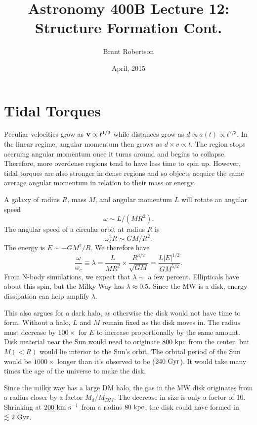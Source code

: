 \documentclass[]{article}
\title{Astronomy 400B Lecture 12: Structure Formation Cont.}
\author{Brant Robertson}
\date{April, 2015}
\begin{document}
\maketitle

\section{Tidal Torques}

Peculiar velocities grow as $\mathbf{v}\propto t^{1/3}$ while distances
grow as $d\propto a(t) \propto t^{2/3}$. In the linear regime,
angular momentum then grows as $d \times v\propto t$. The
region stops accruing angular momentum once it turns around
and begins to collapse. Therefore, more overdense regions 
tend to have less time to spin up.  However, tidal torques
are also stronger in dense regions and so objects
acquire the same average angular momentum in relation to their
mass or energy.

A galaxy of radius $R$, mass $M$, and angular momentum $L$
will rotate an angular speed
\begin{equation}
\omega \sim L / (MR^2).
\end{equation}
\noindent
The angular speed of a circular orbit at radius $R$ is
\begin{equation}
\omega_c^2 R \sim G M/R^2.
\end{equation}
The energy is $E\sim - GM^2/R$.  We therefore have 
\begin{equation}
\frac{\omega}{\omega_c}\equiv\lambda = \frac{L}{MR^2} \times \frac{R^{3/2}}{\sqrt{GM}} = \frac{L|E|^{1/2}}{GM^{5/2}}.
\end{equation}
\noindent
From N-body simulations, we expect that $\lambda\sim$ a  few percent.
Ellipticals have about this spin, but the Milky Way has $\lambda \approx 0.5$.
Since the MW is a disk, energy dissipation can help amplify $\lambda$.

This also argues for a dark halo, as otherwise the disk would
not have time to form.  Without a halo, $L$ and $M$ remain
fixed as the disk moves in.  The radius must decrease by $100\times$
for $E$ to increase proportionally by the same amount.
Disk material near the Sun would need to originate $800~\mathrm{kpc}$
from the center, but $M(<R)$ would lie interior to the Sun's orbit.
The orbital period of the Sun would be $1000\times$ longer than
it's observed to be ($240~\mathrm{Gyr}$).  It would take many times the
age of the universe to make the disk.

Since the milky way has a large DM halo, the gas in the MW disk
originates from a radius closer by a factor $M_d/M_{DM}$. The
decrease in size is only a factor of 10.  Shrinking at
$200~\mathrm{km}~\mathrm{s}^{-1}$ from a radius $80~\mathrm{kpc}$, the disk could
have formed in $\lesssim2~\mathrm{Gyr}$.
\end{document}
